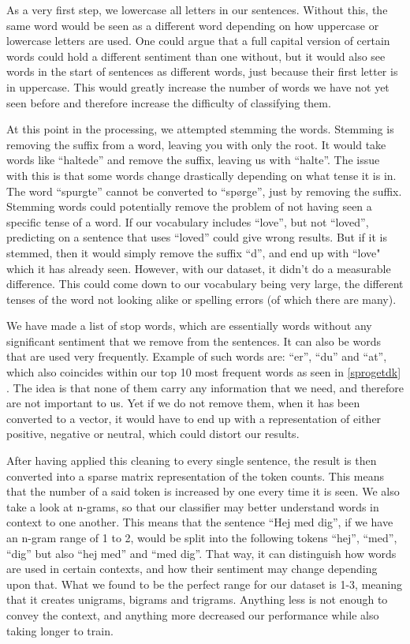 As a very first step, we lowercase all letters in our sentences. Without this, the same word would be seen as a different word depending on how uppercase or lowercase letters are used.
One could argue that a full capital version of certain words could hold a different sentiment than one without, but it would also see words in the start of sentences as different words, just because their first letter is in uppercase. This would greatly increase the number of words we have not yet seen before and therefore increase the difficulty of classifying them.

At this point in the processing, we attempted stemming the words. Stemming is removing the suffix from a word, leaving you with only the root. It would take words like “haltede” and remove the suffix, leaving us with “halte”. The issue with this is that some words change drastically depending on what tense it is in. The word “spurgte” cannot be converted to “spørge”, just by removing the suffix.
Stemming words could potentially remove the problem of not having seen a specific tense of a word. If our vocabulary includes “love”, but not “loved”, predicting on a sentence that uses “loved” could give wrong results. But if it is stemmed, then it would simply remove the suffix “d”, and end up with “love" which it has already seen.
However, with our dataset, it didn't do a measurable difference. This could come down to our vocabulary being very large, the different tenses of the word not looking alike or spelling errors (of which there are many).

We have made a list of stop words, which are essentially words without any significant sentiment that we remove from the sentences. It can also be words that are used very frequently. Example of such words are: “er”, “du” and “at”, which also coincides within our top 10 most frequent words as seen in \ref{sprogetdk} . The idea is that none of them carry any information that we need, and therefore are not important to us. Yet if we do not remove them, when it has been converted to a vector, it would have to end up with a representation of either positive, negative or neutral, which could distort our results.

After having applied this cleaning to every single sentence, the result is then converted into a sparse matrix representation of the token counts. This means that the number of a said token is increased by one every time it is seen.
We also take a look at n-grams, so that our classifier may better understand words in context to one another. This means that the sentence “Hej med dig”, if we have an n-gram range of 1 to 2, would be split into the following tokens “hej”, “med”, “dig” but also “hej med” and “med dig”.
That way, it can distinguish how words are used in certain contexts, and how their sentiment may change depending upon that.
What we found to be the perfect range for our dataset is 1-3, meaning that it creates unigrams, bigrams and trigrams. Anything less is not enough to convey the context, and anything more decreased our performance while also taking longer to train.

